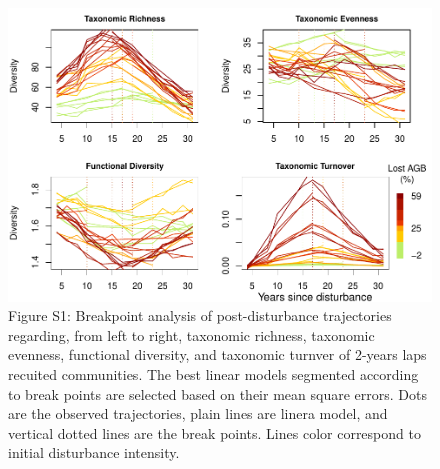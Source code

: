 \documentclass[fleqn,10pt]{ArtEcoFoG} %
\begin{document}
\begin{figure}

{\centering \includegraphics{RecruitmentTrajectories_SuppMat_files/figure-latex/BPanalysis-1} 

}

\caption{Figure S1: Breakpoint analysis of post-disturbance trajectories regarding, from left to right, taxonomic richness, taxonomic evenness, functional diversity, and taxonomic turnver of 2-years laps recuited communities. The best linear models segmented according to break points are selected based on their mean square errors. Dots are the observed trajectories, plain lines are linera model, and vertical dotted lines are the break points. Lines color correspond to initial disturbance intensity.}\label{fig:BPanalysis}
\end{figure}
\end{document}
